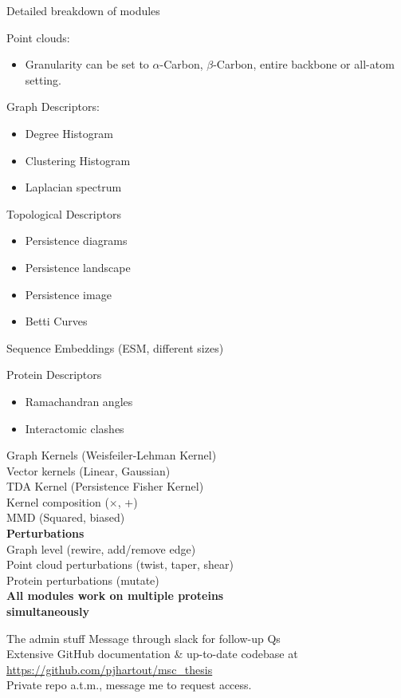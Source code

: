 \documentclass[aspectratio=169, 10pt, dvipsnames]{beamer}
\begin{document}
\begin{frame}[fragile]{Detailed breakdown of modules}
  \footnotesize{
  \begin{minipage}{.45\textwidth}
    Point clouds:
    \begin{itemize}
    \item Granularity can be set to $\alpha$-Carbon, $\beta$-Carbon, entire backbone or all-atom setting.
    \end{itemize}
    Graph Descriptors:
    \begin{itemize}
    \item Degree Histogram
    \item Clustering Histogram
    \item Laplacian spectrum
    \end{itemize}
    Topological Descriptors
    \begin{itemize}
      \item Persistence diagrams
      \item Persistence landscape
      \item Persistence image
      \item Betti Curves
    \end{itemize}
    Sequence Embeddings (ESM, different sizes)
  \end{minipage}
  \hfill
  \begin{minipage}{.45\textwidth}

    Protein Descriptors
      \begin{itemize}
      \item Ramachandran angles
      \item Interactomic clashes
      \end{itemize}
      Graph Kernels (Weisfeiler-Lehman Kernel)\\
      Vector kernels (Linear, Gaussian)\\
      TDA Kernel (Persistence Fisher Kernel)\\
      Kernel composition ($\times$, +)\\
      MMD (Squared, biased)\\
      \newline
      \textbf{Perturbations}\\
      Graph level (rewire, add/remove edge)\\
      Point cloud perturbations (twist, taper, shear)\\
      Protein perturbations (mutate)\\
      \textbf{All modules work on multiple proteins \\simultaneously}
  \end{minipage}
}
\end{frame}

\begin{frame}[fragile]{The admin stuff}
  Message through slack for follow-up Qs\\
  Extensive GitHub documentation \& up-to-date codebase at \\ \faGithub{}
  \url{https://github.com/pjhartout/msc_thesis}\\
  Private repo a.t.m., message me to request access.
\end{frame}
\end{document}
